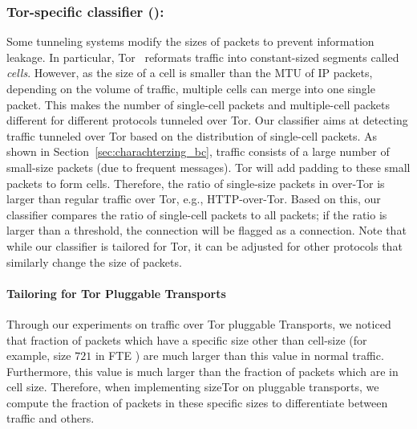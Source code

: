 \subsubsection{Tor-specific classifier ():}

Some tunneling systems modify the sizes of packets to prevent information leakage. In particular, Tor~\cite{tor}
reformats traffic into constant-sized segments called  \emph{cells}. However, as the size of a cell is smaller than the MTU of IP packets, depending on the volume of traffic, multiple cells can merge into one single packet. This makes the number of single-cell packets and multiple-cell packets different for different protocols tunneled over Tor. Our  classifier aims at detecting \bc traffic tunneled over Tor based on the distribution of single-cell packets. 
As shown in Section~\ref{sec:charachterzing_bc}, \bc traffic consists of a large number of small-size packets (due to frequent  messages). Tor will add padding to these small packets to form cells. Therefore, the ratio of single-size packets in \bc over-Tor is larger than regular traffic over Tor, e.g., HTTP-over-Tor. Based on this, our classifier compares the ratio of single-cell packets to all packets; if the ratio is larger than a threshold, the connection will be flagged as a \bc connection. 
Note that while our  classifier is tailored for Tor, it can be adjusted for other protocols that similarly change the size of packets.
\paragraph*{Tailoring for Tor Pluggable Transports}
 Through our experiments on \bc traffic over Tor pluggable Transports, we noticed that fraction of packets which have a specific size other than cell-size (for example, size $721$ in FTE ) are much larger than this value in normal traffic. Furthermore, this value is much larger than the fraction of packets which are in cell size. Therefore, when implementing sizeTor on pluggable transports, we compute the fraction of packets in these specific sizes to differentiate between \bc traffic and others.



